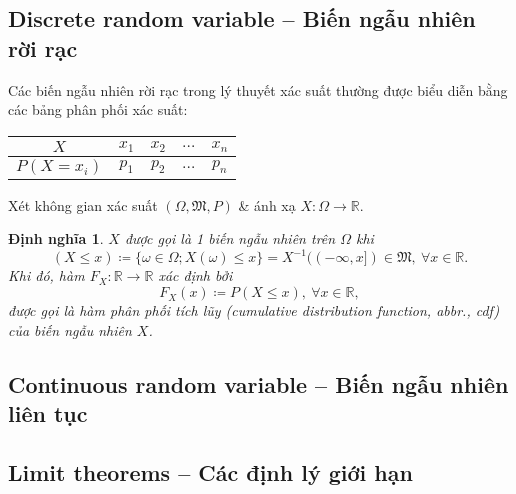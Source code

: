 \documentclass{article}
\newtheorem{dinhnghia}{Định nghĩa}
\begin{document}

\subsection{Discrete random variable -- Biến ngẫu nhiên rời rạc}
Các biến ngẫu nhiên rời rạc trong lý thuyết xác suất thường được biểu diễn bằng các bảng phân phối xác suất:
\begin{table}[H]
	\centering
	\begin{tabular}{|c|c|c|c|c|}
		\hline
		$X$ & $x_1$ & $x_2$ & $\ldots$ & $x_n$ \\
		\hline
		$P(X = x_i)$ & $p_1$ & $p_2$ & $\ldots$ & $p_n$ \\
		\hline
	\end{tabular}
\end{table}
Xét không gian xác suất $(\Omega,\mathfrak{M},P)$ \& ánh xạ $X:\Omega\to\mathbb{R}$.

\begin{dinhnghia}
	$X$ được gọi là 1 {\rm biến ngẫu nhiên} trên $\Omega$ khi
	\begin{equation*}
		(X\le x)\coloneqq\{\omega\in\Omega;X(\omega)\le x\} = X^{-1}((-\infty,x])\in\mathfrak{M},\ \forall x\in\mathbb{R}.
	\end{equation*}
	Khi đó, hàm $F_X:\mathbb{R}\to\mathbb{R}$ xác định bởi
	\begin{equation}
		\label{cdf}
		\tag{cdf}
		F_X(x)\coloneqq P(X\le x),\ \forall x\in\mathbb{R},
	\end{equation}
	được gọi là {\rm hàm phân phối tích lũy (cumulative distribution function, abbr., cdf)} của biến ngẫu nhiên $X$.
\end{dinhnghia}


\subsection{Continuous random variable -- Biến ngẫu nhiên liên tục}


\subsection{Limit theorems -- Các định lý giới hạn}
\end{document}
